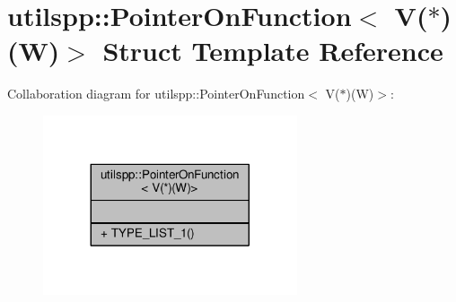 \hypertarget{structutilspp_1_1PointerOnFunction_3_01V_07_5_08_07W_08_4}{\section{utilspp\-:\-:Pointer\-On\-Function$<$ V($\ast$)(W)$>$ Struct Template Reference}
\label{structutilspp_1_1PointerOnFunction_3_01V_07_5_08_07W_08_4}
}


Collaboration diagram for utilspp\-:\-:Pointer\-On\-Function$<$ V($\ast$)(W)$>$\-:
\nopagebreak
\begin{figure}[H]
\begin{center}
\leavevmode
\includegraphics[width=212pt]{structutilspp_1_1PointerOnFunction_3_01V_07_5_08_07W_08_4__coll__graph}
\end{center}
\end{figure}
